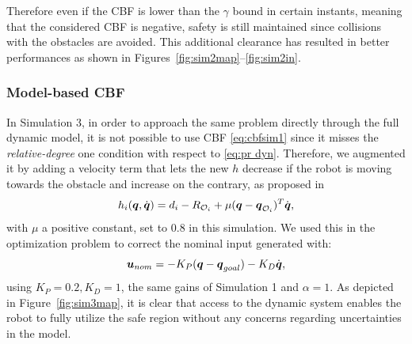 Therefore even if the CBF is lower than the $\gamma$ bound in certain instants, meaning that the considered CBF is negative, safety is still maintained since collisions with the obstacles are avoided.
This additional clearance has resulted in better performances as shown in Figures~\ref{fig:sim2map}--\ref{fig:sim2in}.
\subsubsection{Model-based CBF}
In Simulation 3, in order to approach the same problem directly through the full dynamic model, it is not possible to use CBF \eqref{eq:cbfsim1} since it misses the \textit{relative-degree} one condition with respect to \eqref{eq:pr dyn}. 
Therefore, we augmented it by adding a velocity term that lets the new $h$ decrease if the robot is moving towards the obstacle and increase on the contrary, as proposed in \cite{vendittelli}
\begin{equation}\label{eq:difmcbf}
    h_i({\boldsymbol{q}},\dot{\boldsymbol{q}})= d_i - R_{\mathcal{O}_i}+\mu({\boldsymbol{q}}-{\boldsymbol{q}}_{\mathcal{O}_i})^T\dot{\boldsymbol{q}},
\end{equation}
with $\mu$ a positive constant, set to $0.8$ in this simulation. We used this in the optimization problem to correct the nominal input generated with:
\begin{equation}
\boldsymbol{u}_{nom}=-K_P({\boldsymbol{q}} - {\boldsymbol{q}}_{goal})-K_D \dot{\boldsymbol{q}},
\end{equation}
using $K_P = 0.2, K_D = 1$, the same gains of Simulation 1 and $\alpha = 1$.
As depicted in Figure~\ref{fig:sim3map}, it is clear that access to the dynamic system enables the robot to fully utilize the safe region without any concerns regarding uncertainties in the model.
